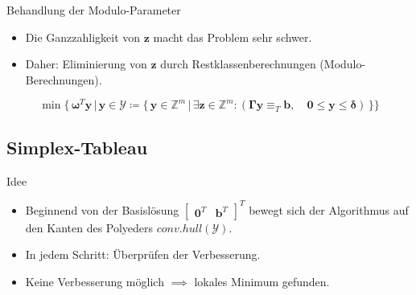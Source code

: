 \documentclass[accentcolor = tud11b, colorbacktitle, landscape, german, presentation, tudmathserif]{tudbeamer}
\newcommand{\Z}{\ensuremath{\mathbb{Z}}}
\newcommand{\mat}[1]{\boldsymbol{\mathbf{#1}}}
\renewcommand{\vec}[1]{\boldsymbol{\mathbf{#1}}}
\begin{document}
			\begin{frame}{Behandlung der Modulo-Parameter}
				\begin{itemize}
					\item Die Ganzzahligkeit von \(\vec{z}\) macht das Problem sehr schwer.
					\item Daher: Eliminierung von \(\vec{z}\) durch Restklassenberechnungen (Modulo-Berechnungen).
				\end{itemize}
			
				\vspace{0.5cm}
				\begin{equation*}
					\min \Big\{\, \vec{\omega}^T \vec{y} \,\big\vert\, \vec{y} \in \mathcal{Y}\coloneqq \big\{\, \vec{y} \in \Z^m \,\vert\, \exists \vec{z} \in \Z^m : ( \mat{\Gamma} \vec{y} \equiv_T \vec{b}, \quad \vec{0} \leq \vec{y} \leq \vec{\delta} ) \,\big\} \Big\}
				\end{equation*}
			\end{frame}
	
		\subsection{Simplex-Tableau}
			\begin{frame}{Idee}
				\begin{itemize}
					\item Beginnend von der Basislösung \( \begin{bmatrix} \vec{0}^T & \vec{b}^T \end{bmatrix}^T \) bewegt sich der Algorithmus auf den Kanten des Polyeders \( \mathit{conv.hull}(\mathcal{Y}) \).
					\item In jedem Schritt: Überprüfen der Verbesserung.
					\item Keine Verbesserung möglich \( \implies \) lokales Minimum gefunden.
				\end{itemize}
			\end{frame}
		
\end{document}
